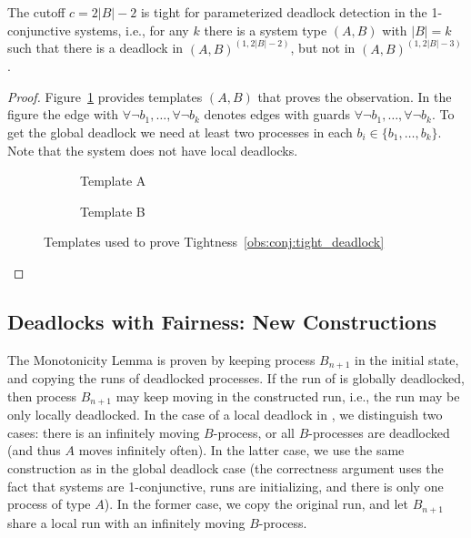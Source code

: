 \begin{tightness} \label{obs:conj:tight_deadlock}
The cutoff $c=2|B|-2$ is tight for parameterized deadlock detection in the 1-conjunctive systems, i.e., for any $k$ there is a system type $(A,B)$ with $|B|=k$ such that there is a deadlock in $(A,B)^{(1,2|B|-2)}$, but not in $(A,B)^{(1,2|B|-3)}$. 
\end{tightness}
\begin{proof} 
Figure~\ref{fig:obs:conj:tight_deadlock} provides templates $(A,B)$ that proves the observation. In the figure the edge with $\forall{\neg b_1},\ldots,\forall{\neg b_k}$ denotes edges with guards $\forall{\neg b_1},\ldots,\forall{\neg b_k}$. To get the global deadlock we need at least two processes in each $b_i \in \{b_1,\ldots,b_k\}$. Note that the system does not have local deadlocks.
\begin{figure}[h]
\vspace{-10pt}
\centering
\begin{subfigure}[b]{0.45\textwidth}\center
\scalebox{0.75}{}
\caption*{Template A}
\end{subfigure}
\hspace{1cm}
\begin{subfigure}[b]{0.45\textwidth}\center
\scalebox{0.75}{}
\caption*{Template B}
\end{subfigure}
\caption{Templates used to prove Tightness~\ref{obs:conj:tight_deadlock}}
\label{fig:obs:conj:tight_deadlock}
\end{figure}
\end{proof}


\subsection{Deadlocks with Fairness: New Constructions} \label{gua:sec:proofs-conj-deadlock-fair}

The Monotonicity Lemma is proven by keeping process $B_{n+1}$ in the initial state, 
and copying the runs of deadlocked processes.
If the run of \largesys is globally deadlocked,
then process $B_{n+1}$ may keep moving in the constructed run,
i.e., the run may be only locally deadlocked. 
In the case of a local deadlock in \largesys, we distinguish two cases: 
there is an infinitely moving $B$-process, or all $B$-processes are deadlocked 
(and thus $A$ moves infinitely often).
In the latter case, we use the same construction as in the global deadlock case
(the correctness argument uses the fact that systems are 1-conjunctive, 
 runs are initializing, and there is only one process of type $A$).
In the former case, we copy the original run, and let $B_{n+1}$ share
a local run with an infinitely moving $B$-process.


